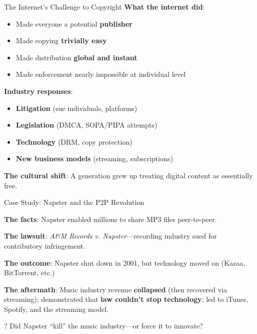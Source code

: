 \documentclass[aspectratio=169]{beamer}
\begin{document}
\begin{frame}{The Internet's Challenge to Copyright}
\textbf{What the internet did}:
\begin{itemize}
    \item Made everyone a potential \textbf{publisher}
    \item Made copying \textbf{trivially easy}
    \item Made distribution \textbf{global and instant}
    \item Made enforcement nearly impossible at individual level
\end{itemize}

\vspace{0.3cm}
\textbf{Industry responses}:
\begin{itemize}
    \item \textbf{Litigation} (sue individuals, platforms)
    \item \textbf{Legislation} (DMCA, SOPA/PIPA attempts)
    \item \textbf{Technology} (DRM, copy protection)
    \item \textbf{New business models} (streaming, subscriptions)
\end{itemize}

\vspace{0.2cm}
\textbf{The cultural shift}: A generation grew up treating digital content as essentially free.
\end{frame}

\begin{frame}{Case Study: Napster and the P2P Revolution}
\begin{casestudybox}[Napster (1999--2001)]
\textbf{The facts}: Napster enabled millions to share MP3 files peer-to-peer.

\textbf{The lawsuit}: \textit{A\&M Records v. Napster}---recording industry sued for contributory infringement.

\textbf{The outcome}: Napster shut down in 2001, but technology moved on (Kazaa, BitTorrent, etc.)
\end{casestudybox}

\vspace{0.2cm}
\textbf{The aftermath}: Music industry revenue \textbf{collapsed} (then recovered via streaming); demonstrated that \textbf{law couldn't stop technology}; led to iTunes, Spotify, and the streaming model.

\begin{alertblock}{?}
Did Napster ``kill'' the music industry---or force it to innovate?
\end{alertblock}
\end{frame}
\end{document}
